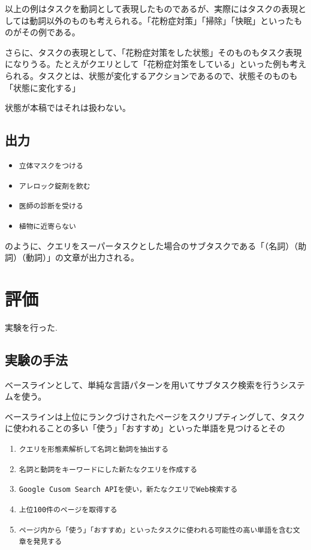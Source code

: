 \documentclass[submit,techreq]{ipsj}
\def\|{\verb|}
\begin{document}
以上の例はタスクを動詞として表現したものであるが、実際にはタスクの表現としては動詞以外のものも考えられる。「花粉症対策」「掃除」「快眠」といったものがその例である。

さらに、タスクの表現として、「花粉症対策をした状態」そのものもタスク表現になりうる。たとえがクエリとして「花粉症対策をしている」といった例も考えられる。タスクとは、状態が変化するアクションであるので、状態そのものも「状態に変化する」

状態が本稿ではそれは扱わない。


\subsection{出力}

\begin{itemize}
\item \|立体マスクをつける|
\item \|アレロック錠剤を飲む|
\item \|医師の診断を受ける|
\item \|植物に近寄らない|
\end{itemize}

のように、クエリをスーパータスクとした場合のサブタスクである「（名詞）（助詞）（動詞）」の文章が出力される。



\section{評価}
実験を行った.

\subsection{実験の手法}
ベースラインとして、単純な言語パターンを用いてサブタスク検索を行うシステムを使う。

ベースラインは上位にランクづけされたページをスクリプティングして、タスクに使われることの多い「使う」「おすすめ」といった単語を見つけるとその

\begin{enumerate}
\item \|クエリを形態素解析して名詞と動詞を抽出する|
\item \|名詞と動詞をキーワードにした新たなクエリを作成する|
\item \|Google Cusom Search APIを使い，新たなクエリでWeb検索する|
\item \|上位100件のページを取得する|
\item \|ページ内から「使う」「おすすめ」といったタスクに使われる可能性の高い単語を含む文章を発見する|
\end{enumerate}
\end{document}

